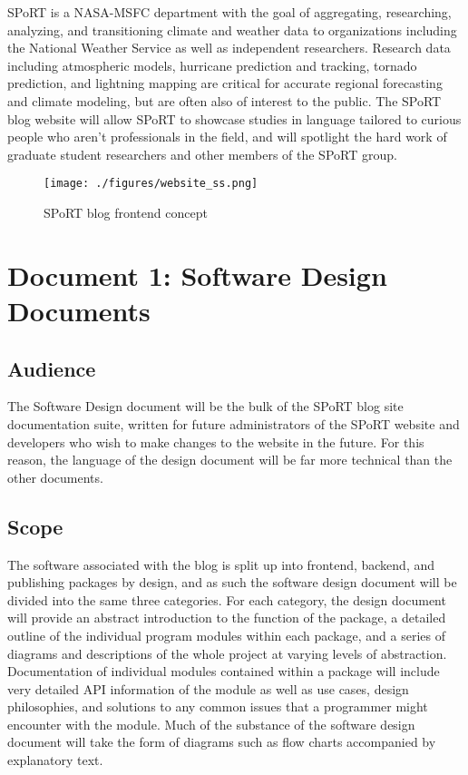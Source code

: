 \documentclass[12pt]{article}
\begin{document}
SPoRT is a NASA-MSFC department with the goal of aggregating, researching, analyzing, and transitioning climate and weather data to organizations including the National Weather Service as well as independent researchers. Research data including atmospheric models, hurricane prediction and tracking, tornado prediction, and lightning mapping are critical for accurate regional forecasting and climate modeling, but are often also of interest to the public. The SPoRT blog website will allow SPoRT to showcase studies in language tailored to curious people who aren't professionals in the field, and will spotlight the hard work of graduate student researchers and other members of the SPoRT group.

\begin{figure}[h]
	\centering
	\texttt{[image: ./figures/website\_ss.png]}
	\caption{SPoRT blog frontend concept}
	\label{concept} %
\end{figure}


\section{Document 1: Software Design Documents}

\subsection{Audience}

The Software Design document will be the bulk of the SPoRT blog site documentation suite, written for future administrators of the SPoRT website and developers who wish to make changes to the website in the future. For this reason, the language of the design document will be far more technical than the other documents.

\subsection{Scope}

The software associated with the blog is split up into frontend, backend, and publishing packages by design, and as such the software design document will be divided into the same three categories. For each category, the design document will provide an abstract introduction to the function of the package, a detailed outline of the individual program modules within each package, and a series of diagrams and descriptions of the whole project at varying levels of abstraction. Documentation of individual modules contained within a package will include very detailed API information of the module as well as use cases, design philosophies, and solutions to any common issues that a programmer might encounter with the module. Much of the substance of the software design document will take the form of diagrams such as flow charts accompanied by explanatory text.
\end{document}
